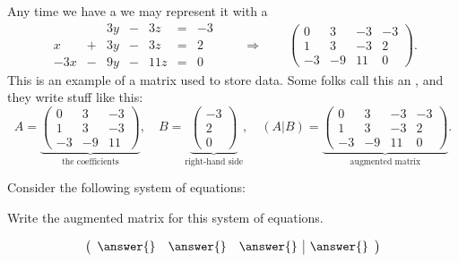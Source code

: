 \documentclass{ximera}
\begin{document}
Any time we have a  we may represent it with a
\[
\begin{array}{ccccccc}
       & & 3y &-& 3z &=& -3 \\
     x& +&3y&-&3z&=&2\\
     -3x& -&9y&-&11z&=&0
\end{array}
\qquad\Longrightarrow\qquad
\left(\begin{array}{ccc|c}
  0 &   3 & -3 & -3 \\
  1 &   3 & -3 & 2  \\
  -3& -9  & 11 & 0
\end{array}\right).
\]
This is an example of a matrix used to store data. Some folks call
this an , and they write stuff like this:
\[
A = \underbrace{\begin{pmatrix}
  0 & 3 & -3  \\
  1 &  3  & -3 \\
 -3 & -9 & 11
\end{pmatrix}}_{\text{the coefficients}},
\quad
B =
\underbrace{\begin{pmatrix}
 -3\\ 2 \\ 0
\end{pmatrix}}_{\text{right-hand side}},
\quad
\left(A|B\right) = \underbrace{\left(\begin{array}{ccc|c}
  0 &   3 & -3 & -3 \\
  1 &   3 & -3 & 2  \\
  -3& -9  & 11 & 0
\end{array}\right)}_{\text{augmented matrix}}.
\]

\begin{question}
  Consider the following system of equations:

  Write the augmented matrix for this system of equations.
  \begin{prompt}
    \[
    \left(\begin{array}{ccc|c}
      \answer{} & \answer{} & \answer{} & \answer{}
    \end{array}\right)
    \]
  \end{prompt}
\end{question}
\end{document}
